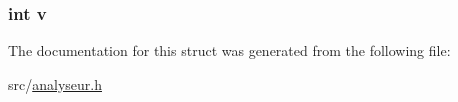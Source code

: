 \subsubsection[{\texorpdfstring{v}{v}}]{\setlength{\rightskip}{0pt plus 5cm}int v}\hypertarget{struct_option_ac8859e8c1ce357c4c8b37bbb1936ba1c}{}\label{struct_option_ac8859e8c1ce357c4c8b37bbb1936ba1c}


The documentation for this struct was generated from the following file\+:\begin{DoxyCompactItemize}
\item 
src/\hyperlink{analyseur_8h}{analyseur.\+h}\end{DoxyCompactItemize}
